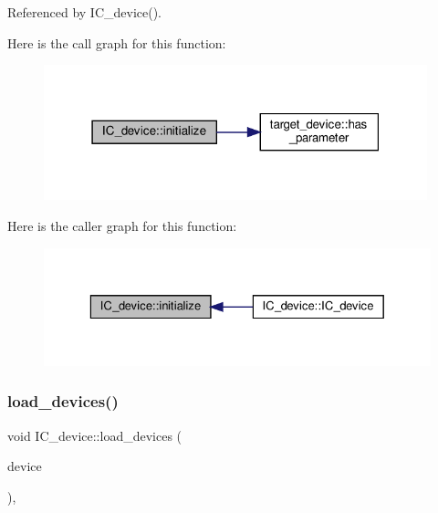 Referenced by I\+C\+\_\+device().

Here is the call graph for this function\+:
\nopagebreak
\begin{figure}[H]
\begin{center}
\leavevmode
\includegraphics[width=315pt]{dc/d61/classIC__device_a7f816b4ac2c63f1384bbbcea096505a8_cgraph}
\end{center}
\end{figure}
Here is the caller graph for this function\+:
\nopagebreak
\begin{figure}[H]
\begin{center}
\leavevmode
\includegraphics[width=329pt]{dc/d61/classIC__device_a7f816b4ac2c63f1384bbbcea096505a8_icgraph}
\end{center}
\end{figure}
\mbox{\label{classIC__device_af925283eae225d0c6deaec8a03a8ce41}} 
\subsubsection{\texorpdfstring{load\+\_\+devices()}{load\_devices()}}
{\footnotesize\ttfamily void I\+C\+\_\+device\+::load\+\_\+devices (\begin{DoxyParamCaption}\item[{const \hyperlink{target__device_8hpp_acedb2b7a617e27e6354a8049fee44eda}{target\+\_\+device\+Ref}}]{device }\end{DoxyParamCaption})\hspace{0.3cm}{\ttfamily [override]}, {\ttfamily [virtual]}}



